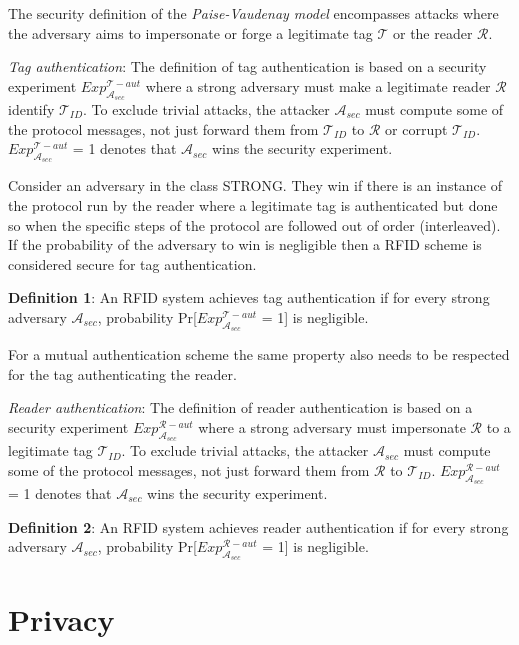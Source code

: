     The security definition of the \textit{Paise-Vaudenay model} \cite{PV model} encompasses attacks where the adversary aims to impersonate or 
    forge a legitimate tag $\mathcal{T}$ or the reader $\mathcal{R}$.

    \textit{Tag authentication}: The definition of tag authentication is based on a security experiment $Exp_{\mathcal{A}_{sec}}^{\mathcal{T}-aut}$
    where a strong adversary must make a legitimate reader $\mathcal{R}$ identify $\mathcal{T}_{ID}$. To exclude trivial attacks, the attacker $\mathcal{A}_{sec}$
    must compute some of the protocol messages, not just forward them from $\mathcal{T}_{ID}$ to $\mathcal{R}$ or corrupt $\mathcal{T}_{ID}$. $Exp_{\mathcal{A}_{sec}}^{\mathcal{T}-aut}$ = 1
    denotes that $\mathcal{A}_{sec}$ wins the security experiment.

    Consider an adversary in the class STRONG. They win if there is an instance of the protocol run
    by the reader where a legitimate tag is authenticated but done so when the specific steps of the 
    protocol are followed out of order (interleaved). If the probability of the adversary to win is 
    negligible then a RFID scheme is considered secure for tag authentication.

    \textbf{Definition 1}: An RFID system achieves tag authentication if for every strong adversary $\mathcal{A}_{sec}$, probability 
    Pr[$Exp_{\mathcal{A}_{sec}}^{\mathcal{T}-aut}$ = 1] is negligible.

    For a mutual authentication scheme the same property also needs to be respected for the tag authenticating
    the reader.

    \textit{Reader authentication}: The definition of reader authentication is based on a security experiment $Exp_{\mathcal{A}_{sec}}^{\mathcal{R}-aut}$
    where a strong adversary must impersonate $\mathcal{R}$ to a legitimate tag $\mathcal{T}_{ID}$. To exclude trivial attacks, the attacker $\mathcal{A}_{sec}$
    must compute some of the protocol messages, not just forward them from $\mathcal{R}$ to $\mathcal{T}_{ID}$. $Exp_{\mathcal{A}_{sec}}^{\mathcal{R}-aut}$ = 1
    denotes that $\mathcal{A}_{sec}$ wins the security experiment.

    \textbf{Definition 2}: An RFID system achieves reader authentication if for every strong adversary $\mathcal{A}_{sec}$, probability 
    Pr[$Exp_{\mathcal{A}_{sec}}^{\mathcal{R}-aut}$ = 1] is negligible.

    \section{Privacy}

